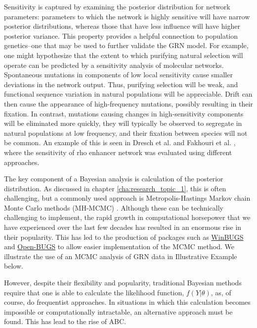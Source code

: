 Sensitivity is captured by examining the posterior distribution for network parameters: parameters to which the network is highly sensitive will have narrow posterior distributions, whereas those that have less influence will have higher posterior variance. This property provides a helpful connection to population genetics–one that may be used to further validate the GRN model. For example, one might hypothesize that the extent to which purifying natural selection will operate can be predicted by a sensitivity analysis of molecular networks. Spontaneous mutations in components of low local sensitivity cause smaller deviations in the network output. Thus, purifying selection will be weak, and functional sequence variation in natural populations will be appreciable. Drift can then cause the appearance of high-frequency mutations, possibly resulting in their fixation. In contrast, mutations causing changes in high-sensitivity components will be eliminated more quickly, they will typically be observed to segregate in natural populations at low frequency, and their fixation between species will not be common. An example of this is seen in Dresch et al. \cite{Dresch2010} and Fakhouri et al. \cite{Fakhouri2010}, where the sensitivity of rho enhancer network was evaluated using different approaches.

The key component of a Bayesian analysis is calculation of the posterior distribution. As discussed in chapter \ref{cha:research_topic_1}, this is often challenging, but a commonly used approach is Metropolis-Hastings Markov chain Monte Carlo methods (MH-MCMC) \cite{Metropolis1953, hastings70}. Although these can be technically challenging to implement, the rapid growth in computational horsepower that we have experienced over the last few decades has resulted in an enormous rise in their popularity. This has led to the production of packages such as \href{http:// www.mrc-bsu.cam.ac.uk/bugs/winbugs/contents.shtml}{WinBUGS} and \href{http://www.openbugs.info/w/}{Open-BUGS} to allow easier implementation of the MCMC method. We illustrate the use of an MCMC analysis of GRN data in Illustrative Example below.

However, despite their flexibility and popularity, traditional Bayesian methods require that one is able to calculate the likelihood function, $f(Y|\theta)$, as, of course, do frequentist approaches. In situations in which this calculation becomes impossible or computationally intractable, an alternative approach must be found. This has lead to the rise of ABC.

